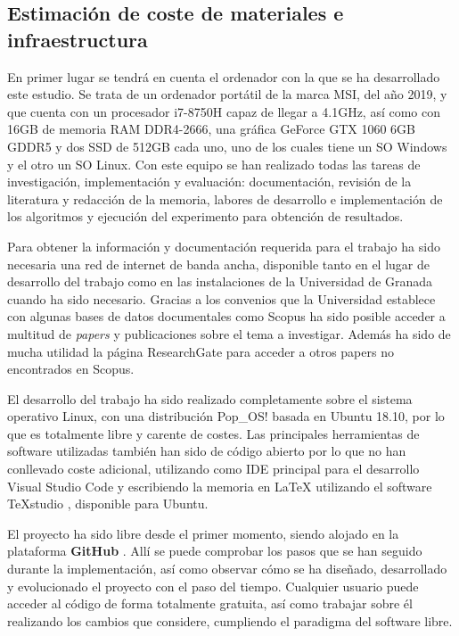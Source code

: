 \subsection{Estimación de coste de materiales e infraestructura}

En primer lugar se tendrá en cuenta el ordenador con la que se ha desarrollado este estudio. Se trata de un ordenador portátil de la marca MSI, del año 2019, y que cuenta con un procesador i7-8750H capaz de llegar a 4.1GHz, así como con 16GB de memoria RAM DDR4-2666, una gráfica GeForce GTX 1060 6GB GDDR5 y dos SSD de 512GB cada uno, uno de los cuales tiene un SO Windows y el otro un SO Linux. Con este equipo se han realizado todas las tareas de investigación, implementación y evaluación: documentación, revisión de la literatura y redacción de la memoria, labores de desarrollo e implementación de los algoritmos y ejecución del experimento para obtención de resultados.

Para obtener la información y documentación requerida para el trabajo ha sido necesaria una red de internet de banda ancha, disponible tanto en el lugar de desarrollo del trabajo como en las instalaciones de la Universidad de Granada cuando ha sido necesario. Gracias a los convenios que la Universidad establece con algunas bases de datos documentales como Scopus \cite{scopus-website} ha sido posible acceder a multitud de \textit{papers} y publicaciones sobre el tema a investigar. Además ha sido de mucha utilidad la página ResearchGate \cite{research-gate-website} para acceder a otros papers no encontrados en Scopus.

El desarrollo del trabajo ha sido realizado completamente sobre el sistema operativo Linux, con una distribución Pop\_OS! \cite{pop-os} basada en Ubuntu 18.10, por lo que es totalmente libre y carente de costes. Las principales herramientas de software utilizadas también han sido de código abierto por lo que no han conllevado coste adicional, utilizando como IDE principal para el desarrollo Visual Studio Code \cite{vscode-github} y escribiendo la memoria en LaTeX utilizando el software TeXstudio \cite{texstudio}, disponible para Ubuntu. 

El proyecto ha sido libre desde el primer momento, siendo alojado en la plataforma \textbf{GitHub} \cite{github-proyecto}. Allí se puede comprobar los pasos que se han seguido durante la implementación, así como observar cómo se ha diseñado, desarrollado y evolucionado el proyecto con el paso del tiempo. Cualquier usuario puede acceder al código de forma totalmente gratuita, así como trabajar sobre él realizando los cambios que considere, cumpliendo el paradigma del software libre.

